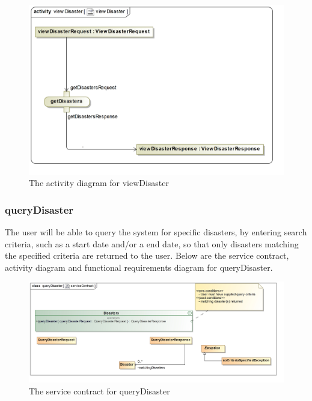 \begin{figure}[H]
	\centering
	\includegraphics[width=1.2\textwidth]{../images/funcReq/viewDisasterActivityDiagram.jpg}
	\caption{The activity diagram for viewDisaster \label{overflow}}
\end{figure}

\subsubsection{queryDisaster}

The user will be able to query the system for specific disasters, by entering search criteria, such as a start date and/or a end date, so that only disasters matching the specified criteria are returned to the user. Below are the service contract, activity diagram and functional requirements diagram for queryDisaster.

 \begin{figure}[H]
	\centering
	\includegraphics[scale=0.19]{../images/funcReq/queryDisasterServiceContract.jpg}
	\caption{The service contract for queryDisaster \label{overflow}}
\end{figure}


